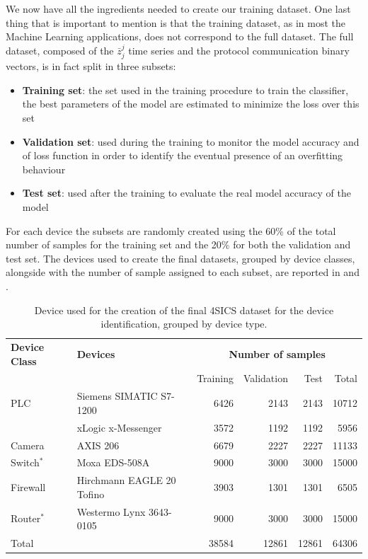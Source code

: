 We now have all the ingredients needed to create our training dataset. One last thing that is important to mention is that the training dataset, as in most the Machine Learning applications,
does not correspond to the full dataset. The full dataset, composed of the $\bar{z}_j^j$ time series and the protocol communication binary vectors, is in fact split in three subsets:
\begin{itemize}[noitemsep, nolistsep]
    \item \textbf{Training set}: the set used in the training procedure to train the classifier, the best parameters of the model are estimated to minimize the loss over this set
    \item \textbf{Validation set}: used during the training to monitor the model accuracy and of  loss function in order to identify the eventual presence of an overfitting behaviour 
    \item \textbf{Test set}: used after the training to evaluate the real model accuracy of the model
\end{itemize}
For each device the subsets are randomly created using the 60\% of the total number of samples for the training set and the 20\% for both the validation and test set.
The devices used to create the final datasets, grouped by device classes, alongside with the number of sample assigned to each subset, are reported in  and .




\begin{table}[h]
\centering
\begin{tabular}{llrrrr}
\toprule
\textbf{Device Class} & \textbf{Devices} & \multicolumn{4}{c}{\textbf{Number of samples}} \\
& & Training & Validation & Test & Total \\
\midrule
\multirow{1}{*}{PLC} & Siemens SIMATIC S7-1200 & 6426 & 2143 & 2143 & 10712  \\
                     & xLogic x-Messenger & 3572 & 1192 & 1192 & 5956  \\
\midrule
\multirow{1}{*}{Camera}  & AXIS 206 & 6679 & 2227 & 2227 & 11133 \\
\midrule
\multirow{1}{*}{Switch$^*$} & Moxa EDS-508A  & 9000 & 3000 & 3000 & 15000 \\
\midrule
\multirow{1}{*}{Firewall}& Hirchmann EAGLE 20 Tofino & 3903 & 1301 & 1301 & 6505 \\
\midrule
\multirow{1}{*}{Router$^*$} & Westermo Lynx 3643-0105  & 9000 & 3000 & 3000 & 15000  \\ 
\midrule
\midrule
Total & & 38584 & 12861 & 12861 & 64306 \\
\bottomrule
\end{tabular}
\caption{Device used for the creation of the final 4SICS dataset for the device identification, grouped by device type.}
\label{tab:4sicsdev}
\end{table}



